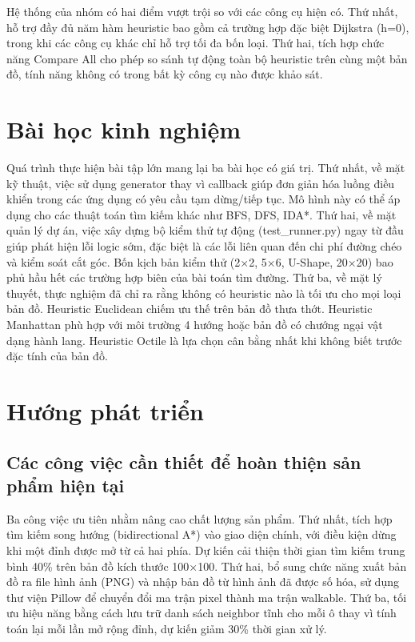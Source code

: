 \documentclass[../BTL.tex]{subfiles}
\begin{document}
Hệ thống của nhóm có hai điểm vượt trội so với các công cụ hiện có. Thứ nhất, hỗ trợ đầy đủ năm hàm heuristic bao gồm cả trường hợp đặc biệt Dijkstra (h=0), trong khi các công cụ khác chỉ hỗ trợ tối đa bốn loại. Thứ hai, tích hợp chức năng Compare All cho phép so sánh tự động toàn bộ heuristic trên cùng một bản đồ, tính năng không có trong bất kỳ công cụ nào được khảo sát.

\section{Bài học kinh nghiệm}
\label{section:4.4}

Quá trình thực hiện bài tập lớn mang lại ba bài học có giá trị. Thứ nhất, về mặt kỹ thuật, việc sử dụng generator thay vì callback giúp đơn giản hóa luồng điều khiển trong các ứng dụng có yêu cầu tạm dừng/tiếp tục. Mô hình này có thể áp dụng cho các thuật toán tìm kiếm khác như BFS, DFS, IDA*. Thứ hai, về mặt quản lý dự án, việc xây dựng bộ kiểm thử tự động (test\_runner.py) ngay từ đầu giúp phát hiện lỗi logic sớm, đặc biệt là các lỗi liên quan đến chi phí đường chéo và kiểm soát cắt góc. Bốn kịch bản kiểm thử (2×2, 5×6, U-Shape, 20×20) bao phủ hầu hết các trường hợp biên của bài toán tìm đường. Thứ ba, về mặt lý thuyết, thực nghiệm đã chỉ ra rằng không có heuristic nào là tối ưu cho mọi loại bản đồ. Heuristic Euclidean chiếm ưu thế trên bản đồ thưa thớt. Heuristic Manhattan phù hợp với môi trường 4 hướng hoặc bản đồ có chướng ngại vật dạng hành lang. Heuristic Octile là lựa chọn cân bằng nhất khi không biết trước đặc tính của bản đồ.

\section{Hướng phát triển}
\label{section:4.5}

\subsection{Các công việc cần thiết để hoàn thiện sản phẩm hiện tại}
\label{section:4.5.1}

Ba công việc ưu tiên nhằm nâng cao chất lượng sản phẩm. Thứ nhất, tích hợp tìm kiếm song hướng (bidirectional A*) vào giao diện chính, với điều kiện dừng khi một đỉnh được mở từ cả hai phía. Dự kiến cải thiện thời gian tìm kiếm trung bình 40\% trên bản đồ kích thước 100×100. Thứ hai, bổ sung chức năng xuất bản đồ ra file hình ảnh (PNG) và nhập bản đồ từ hình ảnh đã được số hóa, sử dụng thư viện Pillow để chuyển đổi ma trận pixel thành ma trận walkable. Thứ ba, tối ưu hiệu năng bằng cách lưu trữ danh sách neighbor tĩnh cho mỗi ô thay vì tính toán lại mỗi lần mở rộng đỉnh, dự kiến giảm 30\% thời gian xử lý.
\end{document}
